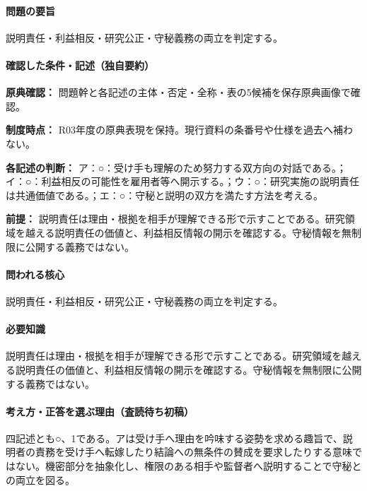 \paragraph{問題の要旨} 説明責任・利益相反・研究公正・守秘義務の両立を判定する。

\paragraph{確認した条件・記述（独自要約）}\mbox{}\par

\noindent\textbf{原典確認：} 問題幹と各記述の主体・否定・全称・表の5候補を保存原典画像で確認。\par

\noindent\textbf{制度時点：} R03年度の原典表現を保持。現行資料の条番号や仕様を過去へ補わない。\par

\noindent\textbf{各記述の判断：} ア：○：受け手も理解のため努力する双方向の対話である。；イ：○：利益相反の可能性を雇用者等へ開示する。；ウ：○：研究実施の説明責任は共通価値である。；エ：○：守秘と説明の双方を満たす方法を考える。\par

\noindent\textbf{前提：} 説明責任は理由・根拠を相手が理解できる形で示すことである。研究領域を越える説明責任の価値と、利益相反情報の開示を確認する。守秘情報を無制限に公開する義務ではない。\par

\paragraph{問われる核心} 説明責任・利益相反・研究公正・守秘義務の両立を判定する。

\paragraph{必要知識} 説明責任は理由・根拠を相手が理解できる形で示すことである。研究領域を越える説明責任の価値と、利益相反情報の開示を確認する。守秘情報を無制限に公開する義務ではない。

\paragraph{考え方・正答を選ぶ理由（査読待ち初稿）} 四記述とも○、1である。アは受け手へ理由を吟味する姿勢を求める趣旨で、説明者の責務を受け手へ転嫁したり結論への無条件の賛成を要求したりする意味ではない。機密部分を抽象化し、権限のある相手や監督者へ説明することで守秘との両立を図る。


